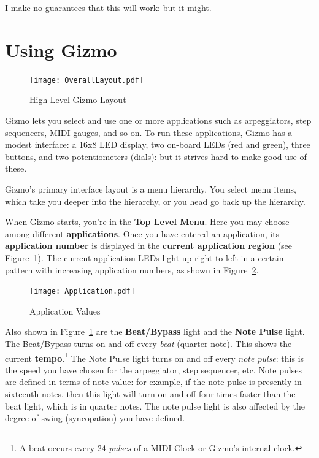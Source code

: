 \documentclass{article}
\begin{document}
I make no guarantees that this will work: but it might.

\clearpage

\section{Using Gizmo}

\begin{figure}
\vspace{-1.5em}\texttt{[image: OverallLayout.pdf]}
\vspace{-2.5em}\caption{\small High-Level Gizmo Layout}
\label{HighLevelGizmoLayout}
\vspace{-1em}
\end{figure}

Gizmo lets you select and use one or more applications such as arpeggiators, step sequencers, MIDI gauges, and so on.  To run these applications, Gizmo has a modest interface: a 16x8 LED display, two on-board LEDs (red and green), three buttons, and two potentiometers (dials): but it strives hard to make good use of these.  

Gizmo's primary interface layout is a menu hierarchy.  You select menu items, which take you deeper into the hierarchy, or you head go back up the hierarchy.  

When Gizmo starts, you're in the {\bf Top Level Menu}.  Here you may choose among different {\bf applications}.  Once you have entered an application, its {\bf application number} is displayed in the {\bf current application region} (see Figure~\ref{HighLevelGizmoLayout}). The current application LEDs light up right-to-left in a certain pattern with increasing application numbers, as shown in Figure~\ref{applicationvalues}.   

\begin{figure}
\vspace{-1em}\texttt{[image: Application.pdf]}
\vspace{-2em}\caption{\small Application Values}
\vspace{-1em}
\label{applicationvalues}
\end{figure}

Also shown in Figure~\ref{HighLevelGizmoLayout} are the {\bf Beat/Bypass} light and the {\bf Note Pulse} light.  The Beat/Bypass turns on and off every {\it beat} (quarter note).  This shows the current {\bf tempo}.\footnote{A beat occurs every 24 {\it pulses} of a MIDI Clock or Gizmo's internal clock.}  The Note Pulse light turns on and off every {\it note pulse}: this is the speed you have chosen for the arpeggiator, step sequencer, etc.  Note pulses are defined in terms of note value: for example, if the note pulse is presently in sixteenth notes, then this light will turn on and off four times faster than the beat light, which is in quarter notes. The note pulse light is also affected by the degree of swing (syncopation) you have defined.
\end{document}
